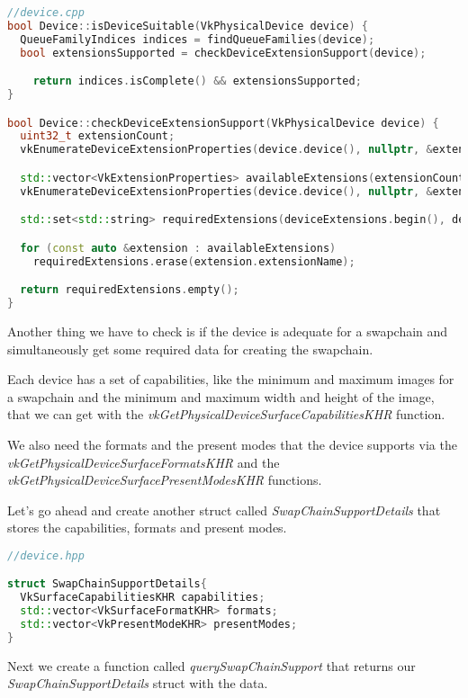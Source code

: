 \documentclass[12pt]{report} \usepackage{preamble}
\begin{document}
\begin{lstlisting}[language=C++]
//device.cpp
bool Device::isDeviceSuitable(VkPhysicalDevice device) {
  QueueFamilyIndices indices = findQueueFamilies(device);
  bool extensionsSupported = checkDeviceExtensionSupport(device);

	return indices.isComplete() && extensionsSupported;
}

bool Device::checkDeviceExtensionSupport(VkPhysicalDevice device) {
  uint32_t extensionCount;
  vkEnumerateDeviceExtensionProperties(device.device(), nullptr, &extensionCount, nullptr);

  std::vector<VkExtensionProperties> availableExtensions(extensionCount);
  vkEnumerateDeviceExtensionProperties(device.device(), nullptr, &extensionCount, availableExtensions.data());

  std::set<std::string> requiredExtensions(deviceExtensions.begin(), deviceExtensions.end());

  for (const auto &extension : availableExtensions)
    requiredExtensions.erase(extension.extensionName);

  return requiredExtensions.empty();
}
\end{lstlisting}

Another thing we have to check is if the device is adequate for a swapchain and simultaneously
get some required data for creating the swapchain.

Each device has a set of capabilities, like the minimum and maximum images for a swapchain
and the minimum and maximum width and height of the image, that we can get with the
\textit{vkGetPhysicalDeviceSurfaceCapabilitiesKHR} function.

We also need the formats and the present modes that the device supports via the \\
\textit{vkGetPhysicalDeviceSurfaceFormatsKHR} and the \textit{vkGetPhysicalDeviceSurfacePresentModesKHR}
functions.

Let's go ahead and create another struct called \textit{SwapChainSupportDetails} that stores the capabilities,
formats and present modes.

\begin{lstlisting}[language=C++]
//device.hpp

struct SwapChainSupportDetails{
  VkSurfaceCapabilitiesKHR capabilities;
  std::vector<VkSurfaceFormatKHR> formats;
  std::vector<VkPresentModeKHR> presentModes;
}
\end{lstlisting}

Next we create a function called \textit{querySwapChainSupport} that returns our
\textit{SwapChainSupportDetails} struct with the data.
\end{document}
